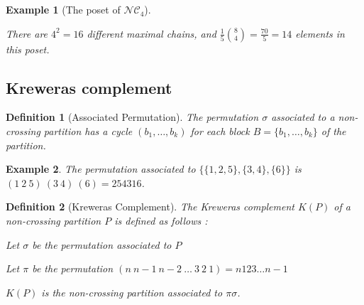 \documentclass[12pt]{report}
\newtheorem{definition}{Definition}
\newtheorem*{example}{Example}
\begin{document}
\begin{example}[The poset of $\mathcal{NC}_4$]
\begin{center}
        
        There are $4^2 = 16$ different maximal chains,
        and $\frac {1}{5} \binom{8}{4} = \frac{70}{5} = 14$
        elements in this poset.
    \end{center}
\end{example}



\subsection{Kreweras complement}

\begin{definition}[Associated Permutation]
    The \emph{permutation} $\sigma$ associated to a non-crossing
    partition has a cycle $(b_1, \ldots, b_k)$ for each block
    $B = \{b_1, \ldots, b_k\}$ of the partition.
\end{definition}

\begin{example}
    The permutation associated to $\{\{1, 2, 5\}, \{3, 4\}, \{6\}\}$
    is $(1\ 2\ 5)\ (3\ 4)\ (6) = 254316$.
\end{example}

\begin{definition}[Kreweras Complement]
    The \emph{Kreweras complement} $K (P)$ of a non-crossing
    partition $P$ is defined as follows :\\
    \begin{itemize*}
        \item Let $\sigma$ be the permutation associated to $P$\\
        \item Let $\pi$ be the permutation $(n\ n-1\ n-2\
        \ldots\ 3\ 2\ 1) = n123 \ldots n-1$\\
        \item $K (P)$ is the \emph{non-crossing partition}
        associated to $\pi \sigma$.\\
    \end{itemize*}
\end{definition}
\end{document}
